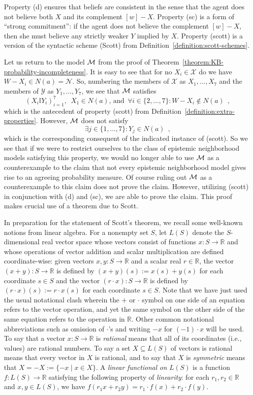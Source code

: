 \documentclass[12pt]{article}
\theoremstyle{definition}
\newcommand{\M}{{\cal M}}      %
\begin{document}
Property (d) ensures that beliefs are consistent in the sense that the
agent does not believe both $X$ and its complement $[w]-X$.
Property (sc) is a form of ``strong commitment'': if the agent does
not believe the complement $[w]-X$, then she must believe any
strictly weaker $Y$ implied by $X$.  Property (scott) is a version of
the syntactic scheme (Scott) from
Definition~\ref{definition:scott-schemes}.

Let us return to the model $\M$ from the proof of
Theorem~\ref{theorem:KB-probability-incompleteness}.  It is easy to
see that for no $X_i\in\mathcal{X}$ do we have
$W-X_i\in N(a)=\mathcal{N}$.  So, numbering the members of
$\mathcal{X}$ as $X_1,\dots,X_7$ and the members of $\mathcal{Y}$ as
$Y_1,\dots,Y_7$, we see that $\M$ satisfies
\[
(X_i\mathbb{I}Y_i)_{i=1}^7,\enspace X_1\in N(a)\text{, and}\enspace
\forall i\in\{2,\dots,7\}:W-X_i\notin N(a)\enspace,
\]
which is the antecedent of property (scott) from
Definition~\ref{definition:extra-properties}.  However, $\M$ does not
satisfy
\[
\exists j\in\{1,\dots,7\}:Y_j\in N(a)\enspace,
\]
which is the corresponding consequent of the indicated instance of
(scott).  So we see that if we were to restrict ourselves to the class
of epistemic neighborhood models satisfying this property, we would no
longer able to use $\M$ as a counterexample to the claim that not
every epistemic neighborhood model gives rise to an agreeing
probability measure.  Of course ruling out $\M$ as a counterexample to
this claim does not prove the claim.  However, utilizing (scott) in
conjunction with (d) and (sc), we are able to prove the claim.  This
proof makes crucial use of a theorem due to Scott.

In preparation for the statement of Scott's theorem, we recall some
well-known notions from linear algebra.  For a nonempty set $S$, let
$L(S)$ denote the $S$-dimensional real vector space whose vectors
consist of functions $x:S\to\mathbb{R}$ and whose operations of vector
addition and scalar multiplication are defined coordinate-wise: given
vectors $x,y:S\to\mathbb{R}$ and a scalar real $r\in\mathbb{R}$, the
vector $(x+y):S\to\mathbb{R}$ is defined by $(x+y)(s):=x(s)+y(s)$ for
each coordinate $s\in S$ and the vector $(r\cdot x):S\to\mathbb{R}$ is
defined by $(r\cdot x)(s):=r\cdot x(s)$ for each coordinate $s\in S$.
Note that we have just used the usual notational clash wherein the $+$
or $\cdot$ symbol on one side of an equation refers to the vector
operation, and yet the same symbol on the other side of the same
equation refers to the operation in $\mathbb{R}$. Other common
notational abbreviations such as omission of $\cdot$'s and writing
$-x$ for $(-1)\cdot x$ will be used. To say that a vector
$x:S\to\mathbb{R}$ is \emph{rational} means that all of its
coordinates (i.e., values) are rational numbers.  To say a set
$X\subseteq L(S)$ of vectors is rational means that every vector in
$X$ is rational, and to say that $X$ is \emph{symmetric} means that
$X=-X:=\{-x\mid x\in X\}$.  A \emph{linear functional on $L(S)$} is a
function $f:L(S)\to\mathbb{R}$ satisfying the following property of
\emph{linearity\/}: for each $r_1,r_2\in\mathbb{R}$ and $x,y\in L(S)$,
we have $f(r_1x+r_2y)=r_1\cdot f(x)+r_2\cdot f(y)$.
\end{document}
